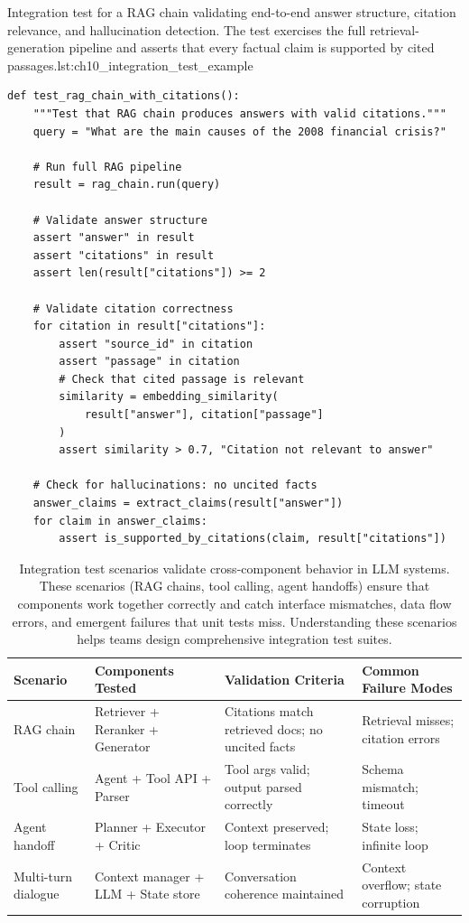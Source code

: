 \begin{codebox}{Integration test for a RAG chain validating end-to-end answer structure, citation relevance, and hallucination detection. The test exercises the full retrieval-generation pipeline and asserts that every factual claim is supported by cited passages.}{lst:ch10_integration_test_example}
\begin{verbatim}
def test_rag_chain_with_citations():
    """Test that RAG chain produces answers with valid citations."""
    query = "What are the main causes of the 2008 financial crisis?"

    # Run full RAG pipeline
    result = rag_chain.run(query)

    # Validate answer structure
    assert "answer" in result
    assert "citations" in result
    assert len(result["citations"]) >= 2

    # Validate citation correctness
    for citation in result["citations"]:
        assert "source_id" in citation
        assert "passage" in citation
        # Check that cited passage is relevant
        similarity = embedding_similarity(
            result["answer"], citation["passage"]
        )
        assert similarity > 0.7, "Citation not relevant to answer"

    # Check for hallucinations: no uncited facts
    answer_claims = extract_claims(result["answer"])
    for claim in answer_claims:
        assert is_supported_by_citations(claim, result["citations"])
\end{verbatim}
\end{codebox}

\begin{table}[t]
\centering
\caption{Integration test scenarios validate cross-component behavior in LLM systems. These scenarios (RAG chains, tool calling, agent handoffs) ensure that components work together correctly and catch interface mismatches, data flow errors, and emergent failures that unit tests miss. Understanding these scenarios helps teams design comprehensive integration test suites.}
\label{tab:ch10_integration_test_scenarios}
\small
\setlength{\tabcolsep}{6pt}
\renewcommand{\arraystretch}{1.3}
\begin{tabularx}{\linewidth}{@{}p{2.8cm}X X p{2.5cm}@{}}
\toprule
\rowcolor{gray!15}
\textbf{Scenario} & \textbf{Components Tested} & \textbf{Validation Criteria} & \textbf{Common Failure Modes} \\
\midrule
RAG chain &
Retriever + Reranker + Generator &
Citations match retrieved docs; no uncited facts &
Retrieval misses; citation errors \\
\midrule
Tool calling &
Agent + Tool API + Parser &
Tool args valid; output parsed correctly &
Schema mismatch; timeout \\
\midrule
Agent handoff &
Planner + Executor + Critic &
Context preserved; loop terminates &
State loss; infinite loop \\
\midrule
Multi-turn dialogue &
Context manager + LLM + State store &
Conversation coherence maintained &
Context overflow; state corruption \\
\bottomrule
\end{tabularx}
\end{table}

